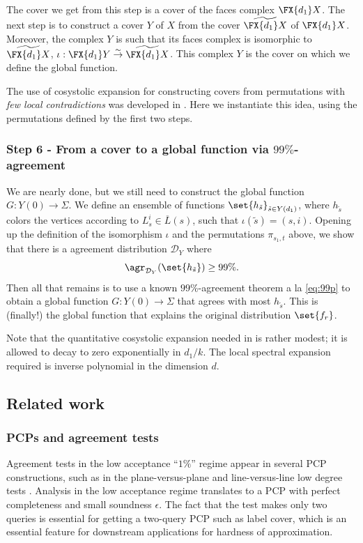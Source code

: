 \documentclass{article}[11pt]
\begin{document}
The cover we get from this step is a cover of the faces complex \(\FX{d_1}X\). The next step is to construct a cover $Y$ of $X$ from the cover \(\widetilde{\FX{d_1}X}\) of \(\FX{d_1}X\). Moreover, the complex $Y$ is such that its faces complex is isomorphic to \(\widetilde{\FX{d_1}X}\), \(\iota:\FX{d_1}Y \overset{\sim}{\to} \widetilde{\FX{d_1}X}\). This complex \(Y\) is the cover on which we define the global function. 

The use of cosystolic expansion for constructing covers from permutations with \emph{few local contradictions} was developed in \cite{DinurM2019}. Here we instantiate this idea, using the permutations defined by the first two steps.


\subsubsection*{Step 6 - From a cover to a global function via \(99\%\)-agreement}
We are nearly done, but we still need to construct the global function \(G:Y(0) \to \Sigma\). We define an ensemble of functions \(\set{h_{\tilde{s}}}_{\tilde{s} \in Y(d_1)}\), where \(h_{\tilde{s}}\) colors the vertices according to \(L_s^i \in \overline{L}(s)\), such that \(\iota(\tilde{s})=(s,i)\). Opening up the definition of the isomorphism \(\iota\) and the permutations \(\pi_{s_1,t}\) above, we show that there is a agreement distribution \(\mathcal{D}_Y\) where \[\agr_{\mathcal{D}_Y} (\set{h_{\tilde{s}}}) \geq 99\%.\] 
Then all that remains is to use a known \(99\%\)-agreement theorem a la \eqref{eq:99p} to obtain a global function \(G:Y(0) \to \Sigma\) that agrees with most \(h_{\tilde{s}}\). This is (finally!) the global function that explains the original distribution \(\set{f_r}\). 

Note that the quantitative cosystolic expansion needed in  is rather modest; it is allowed to decay to zero exponentially in \(d_1/k\). The local spectral expansion required is inverse polynomial in the dimension \(d\).



\subsection*{Related work}
\subsubsection*{PCPs and agreement tests} Agreement tests in the low acceptance ``$1\%$'' regime appear in several PCP constructions, such as in the plane-versus-plane \cite{RaSa} and line-versus-line low degree tests \cite{ArSu}. Analysis in the low acceptance regime translates to a PCP with perfect completeness and small soundness $\epsilon$. The fact that the test makes only two queries is essential for getting a two-query PCP such as label cover, which is an essential feature for downstream applications for hardness of approximation. 
\end{document}
